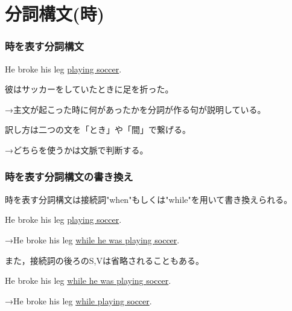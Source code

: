 \documentclass[xcolor=dvipsnames,unicode,14pt]{beamer}%
\begin{document}
\section{分詞構文(時)}
\begin{frame}
  \frametitle{時を表す分詞構文}

  He broke his leg \textcolor{NavyBlue}{\underline{playing 
  \textcolor{black}{soccer}}}.

  彼は\textcolor{NavyBlue}{サッカーをしていたとき}に足を折った。

  →主文が起こった時に何があったかを分詞が作る句が説明している。

  訳し方は二つの文を「とき」や「間」で繋げる。

  →どちらを使うかは文脈で判断する。

\end{frame}
\begin{frame}
  \frametitle{時を表す分詞構文の書き換え}

  時を表す分詞構文は接続詞"when"もしくは"while"を用いて書き換えられる。

  He broke his leg \textcolor{NavyBlue}{\underline{playing 
  \textcolor{black}{soccer}}}.

  →He broke his leg \textcolor{NavyBlue}{\underline{while he was playing 
  \textcolor{black}{soccer}}}.

  また，接続詞の後ろのS,Vは省略されることもある。

  He broke his leg \textcolor{NavyBlue}{\underline{while he was playing 
  \textcolor{black}{soccer}}}.

  →He broke his leg \textcolor{NavyBlue}{\underline{while playing 
  \textcolor{black}{soccer}}}.

\end{frame}
\end{document}
